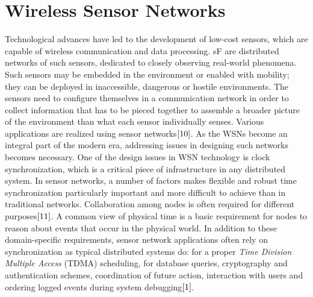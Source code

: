 \documentclass[a4paper,10pt]{report}
\begin{document}
\section{\textbf{Wireless Sensor Networks}}
Technological advances have led to the development of low-cost sensors, which are capable of wireless communication and
data processing. sF are distributed networks of such sensors, dedicated to closely observing
real-world phenomena. Such sensors may be embedded in the environment  or enabled with mobility; they can be deployed in
inaccessible, dangerous or hostile environments. The sensors need to configure themselves in a communication network in order to collect
information that has to be pieced together to assemble a broader picture of the environment than what each sensor individually
senses. Various applications are realized using sensor networks$\cite{10}$. As the WSNs become an integral part of the modern era, addressing issues in designing such networks becomes necessary.
\newline One of the design issues in WSN technology is clock synchronization, which is a critical piece of infrastructure in any
distributed system. In sensor networks, a number of factors makes flexible and robust time synchronization particularly important and
more difficult to achieve than in traditional networks.
\newline
Collaboration among nodes is often required for different purposes$\cite{11}$. A common view of physical time is a basic
requirement for nodes to reason about events that occur in the physical world. In addition to these domain-specific requirements,
sensor network applications often rely on synchronization as typical distributed systems do: for a proper \textit{Time Division Multiple Access} (TDMA) scheduling, for database queries, cryptography and authentication schemes, coordination of future action, interaction with users and ordering logged events during system debugging$\cite{1}$.
\end{document}

